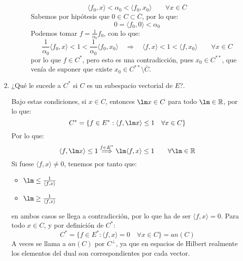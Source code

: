 \begin{ejercicio}
\begin{enumerate}
\begin{description}
                    \begin{equation*}
                        \langle f_0,x \rangle  < \alpha_0 < \langle f_0,x_0 \rangle  \qquad \forall x\in \overline{C}
                    \end{equation*}
                    Sabemos por hipótesis que $0\in C\subset \overline{C}$, por lo que:
                    \begin{equation*}
                        0 = \langle f_0,0 \rangle  < \alpha_0
                    \end{equation*}
                    Podemos tomar $f=\frac{1}{\alpha_0}f_0$, con lo que:
                    \begin{equation*}
                        \frac{1}{\alpha_0} \langle f_0,x \rangle  < 1 < \frac{1}{\alpha_0}\langle f_0,x_0 \rangle  \quad \Longrightarrow \quad \langle f,x \rangle  < 1 < \langle f,x_0 \rangle  \qquad \forall x\in C
                    \end{equation*}
                    por lo que $f\in C^{\ast}$, pero esto es una contradicción, pues $x_0\in C^{\ast\ast}$, que venía de suponer que existe $x_0\in C^{\ast\ast}\setminus \overline{C}$.
            \end{description}
        \item ¿Qué le sucede a $C^\ast$ si $C$ es un subespacio vectorial de $E$?.

            Bajo estas condiciones, si $x\in C$, entonces $\lm x\in C$ para todo $\lm \in \mathbb{R}$, por lo que:
            \begin{equation*}
                C^\ast = \{f\in E^\ast : \langle f,\lm x \rangle \leq 1 \quad \forall x\in C \}
            \end{equation*}
            Por lo que:
            \begin{equation*}
                \langle f,\lm x \rangle  \leq 1 \stackrel{f\in E^\ast}{\Longrightarrow } \lm \langle f,x \rangle  \leq 1 \qquad \forall \lm \in \mathbb{R}
            \end{equation*}
            Si fuese $\langle f,x \rangle \neq 0 $, tenemos por tanto que:
            \begin{itemize}
                \item $\lm \leq \frac{1}{\langle f,x \rangle }$
                \item $\lm \geq \frac{1}{\langle f,x \rangle }$
            \end{itemize}
            en ambos casos se llega a contradicción, por lo que ha de ser $\langle f,x \rangle = 0 $. Para todo $x\in C$, y por definición de $C^\ast$:
            \begin{equation*}
                C^\ast = \{f\in E^\ast : \langle f,x \rangle = 0 \quad \forall x\in C \} = an(C)
            \end{equation*}
            A veces se llama a $an(C)$ por $C^\perp$, ya que en espacios de Hilbert realmente los elementos del dual son correspondientes por cada vector.
    \end{enumerate}
\end{ejercicio}
